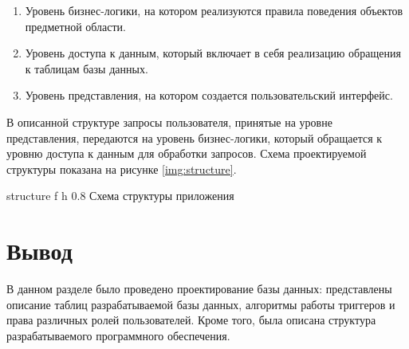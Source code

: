 \begin{enumerate}
	\item Уровень бизнес-логики, на котором реализуются правила поведения объектов предметной области.
	\item Уровень доступа к данным, который включает в себя реализацию обращения к таблицам базы данных.
	\item Уровень представления, на котором создается пользовательский интерфейс.
\end{enumerate}

В описанной структуре запросы пользователя, принятые на уровне представления, передаются на уровень бизнес-логики, который обращается к уровню доступа к данным для обработки запросов. Схема проектируемой структуры показана на рисунке \ref{img:structure}.

    {structure}
    {f}
    {h}
    {0.8\textwidth}
    {Схема структуры приложения}

\section*{Вывод}

В данном разделе было проведено проектирование базы данных: представлены описание таблиц разрабатываемой базы данных, алгоритмы работы триггеров и права различных ролей пользователей. Кроме того, была описана структура разрабатываемого программного обеспечения.